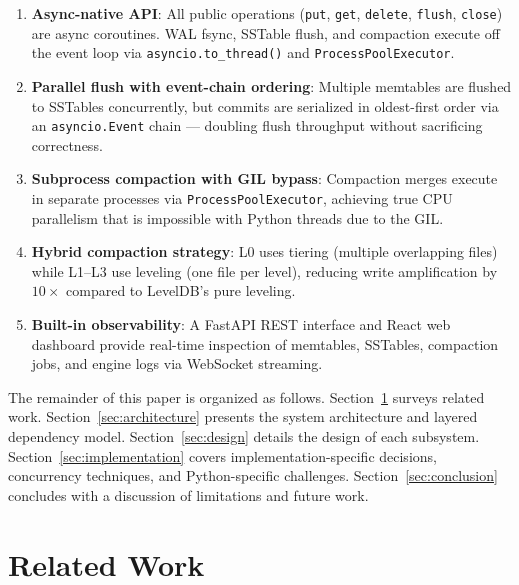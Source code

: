 \documentclass[conference]{IEEEtran}
\begin{document}
\begin{enumerate}[leftmargin=*]
    \item \textbf{Async-native API}: All public operations (\texttt{put}, \texttt{get}, \texttt{delete}, \texttt{flush}, \texttt{close}) are async coroutines. WAL fsync, SSTable flush, and compaction execute off the event loop via \texttt{asyncio.to\_thread()} and \texttt{ProcessPoolExecutor}.

    \item \textbf{Parallel flush with event-chain ordering}: Multiple memtables are flushed to SSTables concurrently, but commits are serialized in oldest-first order via an \texttt{asyncio.Event} chain --- doubling flush throughput without sacrificing correctness.

    \item \textbf{Subprocess compaction with GIL bypass}: Compaction merges execute in separate processes via \texttt{ProcessPoolExecutor}, achieving true CPU parallelism that is impossible with Python threads due to the GIL.

    \item \textbf{Hybrid compaction strategy}: L0 uses tiering (multiple overlapping files) while L1--L3 use leveling (one file per level), reducing write amplification by $10\times$ compared to LevelDB's pure leveling.

    \item \textbf{Built-in observability}: A FastAPI REST interface and React web dashboard provide real-time inspection of memtables, SSTables, compaction jobs, and engine logs via WebSocket streaming.
\end{enumerate}

The remainder of this paper is organized as follows. Section~\ref{sec:related} surveys related work. Section~\ref{sec:architecture} presents the system architecture and layered dependency model. Section~\ref{sec:design} details the design of each subsystem. Section~\ref{sec:implementation} covers implementation-specific decisions, concurrency techniques, and Python-specific challenges. Section~\ref{sec:conclusion} concludes with a discussion of limitations and future work.

\section{Related Work}
\label{sec:related}
\end{document}
